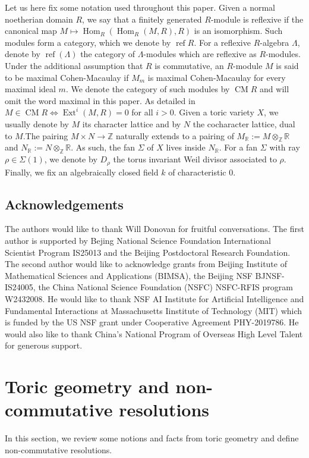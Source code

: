 \documentclass[reqno, 12pt]{amsart}
\theoremstyle{definition}
\numberwithin{equation}{section}
\newcommand{\newterm}{\textsf}
\newcommand{\Hom}{\operatorname{Hom}}
\newcommand{\Z}{\mathbb{Z}}
\newcommand{\R}{\mathbb{R}}
\newcommand{\Ext}{\operatorname{Ext}}
\begin{document}
 Let us here fix some notation used throughout this paper. Given a normal noetherian domain $R$, we say that a finitely generated $R$-module is \newterm{reflexive} if the canonical map $M\mapsto \Hom_R(\Hom_R(M,R),R)$ is an isomorphism. Such modules form a category, which we denote by $\operatorname{ref}R$.  For a reflexive $R$-algebra $\Lambda$, denote by $\operatorname{ref}(\Lambda)$ the category of $\Lambda$-modules which are reflexive as $R$-modules. Under the additional assumption that $R$ is commutative, an $R$-module $M$ is said to be \newterm{maximal Cohen-Macaulay} if $M_m$ is maximal Cohen-Macaulay for every maximal ideal $m$. We denote the category of such modules by $\operatorname{CM}R$ and will omit the word maximal in this paper. As detailed in \cite{IR08, IW14b} $M\in \operatorname{CM}R\Leftrightarrow \Ext^i(M,R)=0$ for all $i>0$.
 Given a toric variety $X$, we usually denote by $M$ its character lattice and by $N$ the cocharacter lattice, dual to $M$.The pairing $M\times N\rightarrow \Z$ naturally extends to a pairing of $M_\R:=M\otimes_\Z \R$ and $N_\R:=N\otimes_\Z\R$.  As such, the fan $\Sigma$ of $X$ lives inside $N_\R$. For a fan $\Sigma$ with ray $\rho\in \Sigma(1)$, we denote by $D_\rho$ the torus invariant Weil divisor associated to $\rho$. 
Finally, we fix an algebraically closed field $k$ of characteristic 0. 

\subsection{Acknowledgements}
The authors would like to thank Will Donovan for fruitful conversations. The first author is supported by Bejing National Science Foundation International Scientist Program IS25013 and the Beijing Postdoctoral Research Foundation.
The second author would like to acknowledge grants from Beijing Institute of Mathematical Sciences and Applications (BIMSA), the Beijing NSF BJNSF-IS24005, the China National Science Foundation (NSFC) NSFC-RFIS program W2432008. He would like to thank NSF AI Institute for Artificial Intelligence and Fundamental Interactions at Massachusetts Iinstitute of Technology (MIT) which is funded by the US NSF grant under Cooperative Agreement PHY-2019786. He would also like to thank China's National Program of Overseas High Level Talent for generous support.

\section{Toric geometry and non-commutative resolutions}\label{Sec:Background}
In this section, we review some notions and facts from toric geometry and define non-commutative resolutions.
\end{document}
